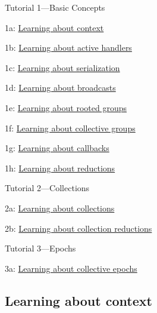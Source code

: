 \begin{DoxyItemize}
\item Tutorial 1---Basic Concepts
\begin{DoxyItemize}
\item 1a\+: \hyperlink{tutorial-1a}{Learning about context}
\item 1b\+: \hyperlink{tutorial-1b}{Learning about active handlers}
\item 1c\+: \hyperlink{tutorial-1c}{Learning about serialization}
\item 1d\+: \hyperlink{tutorial-1d}{Learning about broadcasts}
\item 1e\+: \hyperlink{tutorial-1e}{Learning about rooted groups}
\item 1f\+: \hyperlink{tutorial-1f}{Learning about collective groups}
\item 1g\+: \hyperlink{tutorial-1g}{Learning about callbacks}
\item 1h\+: \hyperlink{tutorial-1h}{Learning about reductions}
\end{DoxyItemize}
\item Tutorial 2---Collections
\begin{DoxyItemize}
\item 2a\+: \hyperlink{tutorial-2a}{Learning about collections}
\item 2b\+: \hyperlink{tutorial-2b}{Learning about collection reductions}
\end{DoxyItemize}
\item Tutorial 3---Epochs
\begin{DoxyItemize}
\item 3a\+: \hyperlink{tutorial-3a}{Learning about collective epochs} 
\end{DoxyItemize}
\end{DoxyItemize}\hypertarget{tutorial-1a}{}\subsection{Learning about context}\label{tutorial-1a}

